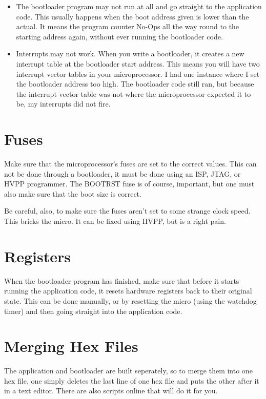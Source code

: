 \documentclass[a4paper, oneside, 11pt, titlepage, onecolumn, openright]{report}
\begin{document}
\begin{itemize}
\item The bootloader program may not run at all and go straight to the application code. This usually happens when the boot address given is lower than the actual. It means the program counter No-Ops all the way round to the starting address again, without ever running the bootloader code.
\item Interrupts may not work. When you write a bootloader, it creates a new interrupt table at the bootloader start address. This means you will have two interrupt vector tables in your microprocessor. I had one instance where I set the bootloader address too high. The bootloader code still ran, but because the interrupt vector table was not where the microprocessor expected it to be, my interrupts did not fire.
\end{itemize}

\section{Fuses}
			\label{s:BootloaderFuses}
			Make sure that the microprocessor's fuses are set to the correct values. This can not be done through a bootloader, it must be done using an ISP, JTAG, or HVPP programmer. The BOOTRST fuse is of course, important, but one must also make sure that the boot size is correct.
			
			Be careful, also, to make sure the fuses aren't set to some strange clock speed. This bricks the micro. It can be fixed using HVPP, but is a right pain.
						
\section{Registers}
			\label{s:BootloaderRegisters}
			When the bootloader program has finished, make sure that before it starts running the application code, it resets hardware registers back to their original state. This can be done manually, or by resetting the micro (using the watchdog timer) and then going straight into the application code.
			
			
\section{Merging Hex Files}
			\label{s:BootloaderMergingHexFiles}
			The application and bootloader are built seperately, so to merge them into one hex file, one simply deletes the last line of one hex file and puts the other after it in a text editor.
			There are also scripts online that will do it for you.
			
\end{document}
